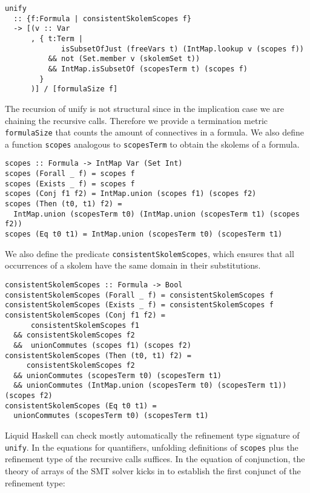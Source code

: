 \documentclass[acmtog, anonymous]{acmart}
\newcommand{\tc}[1]{{\small\texttt{#1}}}
\begin{document}
\begin{verbatim}
unify
  :: {f:Formula | consistentSkolemScopes f}
  -> [(v :: Var
      , { t:Term |
             isSubsetOfJust (freeVars t) (IntMap.lookup v (scopes f))
          && not (Set.member v (skolemSet t))
          && IntMap.isSubsetOf (scopesTerm t) (scopes f)
        }
      )] / [formulaSize f]
\end{verbatim}

The recursion of unify is not structural since in the implication case we
are chaining the recursive calls. Therefore we provide a termination
metric \tc{formulaSize} that counts the amount of connectives in a formula.
We also define a function \tc{scopes} analogous to \tc{scopesTerm} to obtain the skolems
of a formula.

\begin{verbatim}
scopes :: Formula -> IntMap Var (Set Int)
scopes (Forall _ f) = scopes f
scopes (Exists _ f) = scopes f
scopes (Conj f1 f2) = IntMap.union (scopes f1) (scopes f2)
scopes (Then (t0, t1) f2) =
  IntMap.union (scopesTerm t0) (IntMap.union (scopesTerm t1) (scopes f2))
scopes (Eq t0 t1) = IntMap.union (scopesTerm t0) (scopesTerm t1)
\end{verbatim}

We also define the predicate \tc{consistentSkolemScopes}, which ensures that
all occurrences of a skolem have the same domain in their substitutions.

\begin{verbatim}
consistentSkolemScopes :: Formula -> Bool
consistentSkolemScopes (Forall _ f) = consistentSkolemScopes f
consistentSkolemScopes (Exists _ f) = consistentSkolemScopes f
consistentSkolemScopes (Conj f1 f2) =
      consistentSkolemScopes f1
  && consistentSkolemScopes f2
  &&  unionCommutes (scopes f1) (scopes f2)
consistentSkolemScopes (Then (t0, t1) f2) =
     consistentSkolemScopes f2
  && unionCommutes (scopesTerm t0) (scopesTerm t1)
  && unionCommutes (IntMap.union (scopesTerm t0) (scopesTerm t1)) (scopes f2)
consistentSkolemScopes (Eq t0 t1) =
  unionCommutes (scopesTerm t0) (scopesTerm t1)
\end{verbatim}

Liquid Haskell can check mostly automatically the refinement type signature of
\tc{unify}. In the equations for quantifiers, unfolding definitions of
\tc{scopes} plus the refinement type of the recursive calls suffices.
In the equation of conjunction, the theory of arrays of the SMT solver
kicks in to establish the first conjunct of the refinement type:
\end{document}
